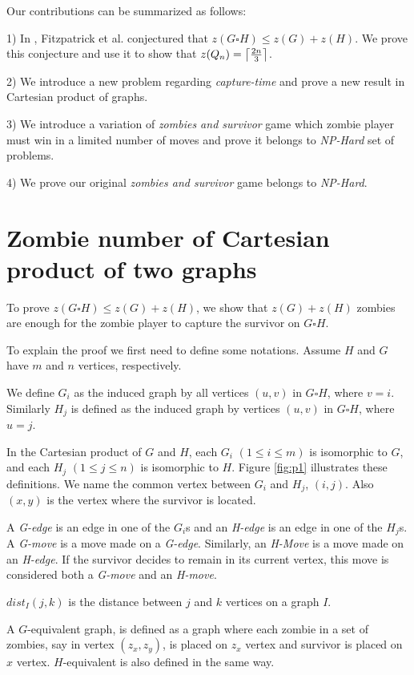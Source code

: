 \documentclass[1p]{elsarticle}
\DeclarePairedDelimiter\ceil{\lceil}{\rceil} \DeclarePairedDelimiter\floor{\lfloor}{\rfloor}
\begin{document}
Our contributions can be summarized as follows:

1) In \cite{Fitz16}, Fitzpatrick et al. conjectured that $z(G \square H) \leq z(G) + z(H)$. We prove this conjecture and
use it to show that $z(Q_n) =  \ceil*{\frac{2n}{3}}$. 

2) We introduce a new problem regarding {\it capture-time} and prove a new result in Cartesian product of graphs.

3) We introduce a variation of {\it zombies and survivor} game which zombie player must win in a limited number of
moves and prove it belongs to {\it NP-Hard} set of problems.

4) We prove our original {\it zombies and survivor} game belongs to {\it NP-Hard}.


\section{Zombie number of Cartesian product of two graphs}\label{conj-proof}

To prove $z(G \square H) \leq z(G) + z(H)$, we show that $z(G) + z(H)$ zombies are enough for the zombie player to
capture the survivor on $G \square H$.

To explain the proof we first need to define some notations. Assume $H$ and $G$ have $m$ and $n$ vertices,
respectively. 

We define $G_{i}$ as the induced graph by all vertices $(u,v)$ in $G \square H$, where $v=i$. Similarly
$H_{j}$ is defined as the induced graph by vertices $(u,v)$ in $G \square H$, where $u=j$.

In the Cartesian product of $G$ and $H$, each $G_{i}$  $(1 \leq i \leq m)$ is isomorphic to $G$, and each $H_{j}$ $(1
\leq j \leq n)$ is isomorphic to $H$. Figure \ref{fig:p1} illustrates these definitions. We name the common vertex
between $G_{i}$ and $H_{j}$, $(i,j)$. Also $(x,y)$ is the vertex where the survivor is located. 

A {\it G-edge} is an edge in one of the $G_{i}$s and an {\it H-edge} is an edge in one of the $H_{j}$s. A {\it G-move}
is a move made on a {\it G-edge}.  Similarly, an {\it H-Move} is a move made on an {\it H-edge}. If the survivor decides
to remain in its current vertex, this move is considered both a {\it G-move} and an {\it H-move}. 

$dist_I(j,k)$ is the distance between $j$ and $k$ vertices on a graph $I$.

A $G$-equivalent graph, is defined as a graph where each zombie in a set of zombies, say in vertex $(z_x,z_y)$, is
placed on $z_x$ vertex and survivor is placed on $x$ vertex. $H$-equivalent is also defined in the same way. 
\end{document}
